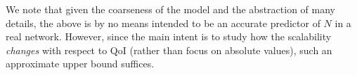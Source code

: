 We note that given the coarseness of the model and the abstraction of many
details, the above is by no means intended to be an accurate predictor of
$N$ in a real network. However, since the main intent is to study how
the scalability {\em changes}
with respect to QoI (rather than focus on absolute values),
such an approximate upper bound suffices.








